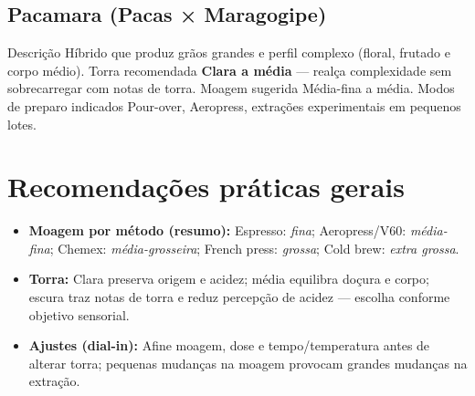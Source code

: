 \documentclass[a4paper,12pt]{article}
\begin{document}
\subsection{Pacamara (Pacas × Maragogipe)}
{Descrição} Híbrido que produz grãos grandes e perfil complexo (floral, frutado e corpo médio).  
{Torra recomendada} \textbf{Clara a média} — realça complexidade sem sobrecarregar com notas de torra.  
{Moagem sugerida} Média-fina a média.  
{Modos de preparo indicados} Pour-over, Aeropress, extrações experimentais em pequenos lotes.

\section{Recomendações práticas gerais}
\begin{itemize}
  \item \textbf{Moagem por método (resumo):} Espresso: \emph{fina}; Aeropress/V60: \emph{média-fina}; Chemex: \emph{média-grosseira}; French press: \emph{grossa}; Cold brew: \emph{extra grossa}.
  \item \textbf{Torra:} Clara preserva origem e acidez; média equilibra doçura e corpo; escura traz notas de torra e reduz percepção de acidez — escolha conforme objetivo sensorial.
  \item \textbf{Ajustes (dial-in):} Afine moagem, dose e tempo/temperatura antes de alterar torra; pequenas mudanças na moagem provocam grandes mudanças na extração.
\end{itemize}




\end{document}
